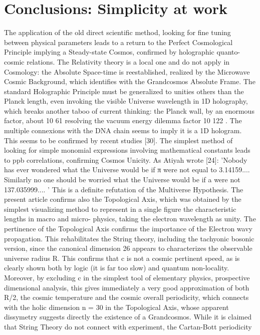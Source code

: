
\chapter{Conclusions: Simplicity at work}

The application of the old direct scientific method, looking for fine tuning between physical
parameters leads to a return to the Perfect Cosmological Principle implying a Steady-state Cosmos,
confirmed by holographic quanto-cosmic relations. The Relativity theory is a local one and do not
apply in Cosmology: the Absolute Space-time is reestablished, realized by the Microwave Cosmic
Background, which identifies with the Grandcosmos Absolute Frame.
The standard Holographic Principle must be generalized to unities others than the Planck length,
even invoking the visible Universe wavelength in 1D holography, which breaks another taboo of
current thinking: the Planck wall, by an enormous factor, about 10 61 resolving the vacuum energy
dilemma factor 10 122 .
The multiple connexions with the DNA chain seems to imply it is a 1D hologram. This seems to
be confirmed by recent studies [30].
The simplest method of looking for simple monomial expressions involving mathematical
constants leads to ppb correlations, confirming Cosmos Unicity. As Atiyah wrote [24]: 'Nobody has
ever wondered what the Universe would be if π were not equal to 3.14159.... Similarly no one
should be worried what the Universe would be if a were not 137.035999.... ' This is a definite
refutation of the Multiverse Hypothesis.
The present article confirms also the Topological Axis, which was obtained by the simplest
visualizing method to represent in a single figure the characteristic lengths in macro and micro-
physics, taking the electron wavelength as unity. The pertinence of the Topological Axis confirms
the importance of the Electron wavy propagation. This rehabilitates the String theory, including the
tachyonic bosonic version, since the canonical dimension 26 appears to characterizes the observable
universe radius R. This confirms that c is not a cosmic pertinent speed, as is clearly shown both by
logic (it is far too slow) and quantum non-locality.
Moreover, by excluding c in the simplest tool of elementary physics, prospective dimensional
analysis, this gives immediately a very good approximation of both R/2, the cosmic temperature
and the cosmic overall periodicity, which connects with the holic dimension n = 30 in the
Topological Axis, whose apparent dissymetry suggests directly the existence of a Grandcosmos.
While it is claimed that String Theory do not connect with experiment, the Cartan-Bott periodicity
